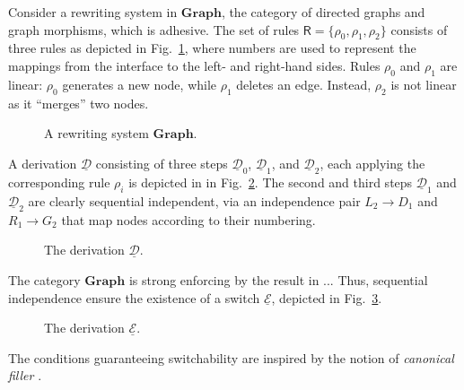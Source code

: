 \documentclass[a4paper,UKenglish,cleveref,pdftex,thm-restate,numberwithinsect]{lipics-v2021}
\newcommand{\cat}[1]{\ensuremath{\mathbf{#1}}}
\def\R{\mathsf{R}}
\newcommand{\dder}[1]{\mathscr{#1}}
\newcommand{\der}[1]{\underline{\dder{#1}}}
\begin{document}
\begin{example}
  \label{ex:seq-ind}
  Consider a rewriting system in $\cat{Graph}$, the category of
  directed graphs and graph morphisms, which is adhesive. The set of
  rules $\R = \{ \rho_0, \rho_1, \rho_2\}$ consists of three rules as
  depicted in Fig.~\ref{fi:rules}, where numbers are used to represent
  the mappings from the interface to the left- and right-hand
  sides. Rules $\rho_0$ and $\rho_1$ are linear: $\rho_0$ generates a
  new node, while $\rho_1$ deletes an edge. Instead, $\rho_2$ is not
  linear as it ``merges'' two nodes.

  \begin{figure}
    
    
    \caption{A rewriting system $\cat{Graph}$.}
    \label{fi:rules}
  \end{figure}
  
  A derivation $\der{D}$ consisting of three steps $\der{D}_0$,
  $\der{D}_1$, and $\der{D}_2$, each applying the corresponding rule
  $\rho_i$ is depicted in in Fig.~\ref{fi:derD}. The second and third
  steps $\der{D}_1$ and $\der{D}_2$ are clearly sequential
  independent, via an independence pair $L_2 \to D_1$ and
  $R_1 \to G_2$ that map nodes according to their numbering.
  
  \begin{figure}
    
    \caption{The derivation $\der{D}$.}
    \label{fi:derD}
  \end{figure}

  The category $\cat{Graph}$ is strong enforcing by the result in ...  Thus,
  sequential independence ensure the existence of a switch $\der{E}$,
  depicted in Fig.~\ref{fi:derE}.
  \begin{figure}
    
    \caption{The derivation $\der{E}$.}
    \label{fi:derE}
  \end{figure}
\end{example}
\fi 

The conditions guaranteeing switchability are inspired
by the notion of \emph{canonical filler}
\cite{heindel2009category}.
\end{document}
